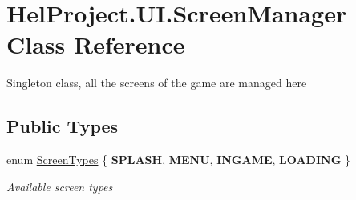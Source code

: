 \hypertarget{class_hel_project_1_1_u_i_1_1_screen_manager}{}\section{Hel\+Project.\+U\+I.\+Screen\+Manager Class Reference}
\label{class_hel_project_1_1_u_i_1_1_screen_manager}


Singleton class, all the screens of the game are managed here  


\subsection*{Public Types}
\begin{DoxyCompactItemize}
\item 
enum \hyperlink{class_hel_project_1_1_u_i_1_1_screen_manager_af86dcb0d11cec6ce52f50e9b98798175}{Screen\+Types} \{ {\bfseries S\+P\+L\+A\+S\+H}, 
{\bfseries M\+E\+N\+U}, 
{\bfseries I\+N\+G\+A\+M\+E}, 
{\bfseries L\+O\+A\+D\+I\+N\+G}
 \}
\begin{DoxyCompactList}\small\item\em Available screen types \end{DoxyCompactList}\end{DoxyCompactItemize}
